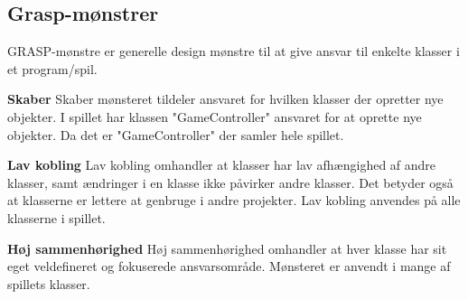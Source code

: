 \subsection{Grasp-mønstrer}
GRASP-mønstre er generelle design mønstre til at give ansvar til enkelte klasser i et program/spil.

\vspace{.3cm}
\textbf{Skaber}
Skaber mønsteret tildeler ansvaret for hvilken klasser der opretter nye objekter.
I spillet har klassen "GameController" ansvaret for at oprette nye objekter. Da det er "GameController" der samler hele spillet.

\vspace{.3cm}
\textbf{Lav kobling}
Lav kobling omhandler at klasser har lav afhængighed af andre klasser, samt ændringer i en klasse ikke påvirker andre klasser. Det betyder også at klasserne er lettere at genbruge i andre projekter. Lav kobling anvendes på alle klasserne i spillet. 

\vspace{.3cm}
\textbf{Høj sammenhørighed}
Høj sammenhørighed omhandler at hver klasse har sit eget veldefineret og fokuserede ansvarsområde. Mønsteret er anvendt i mange af spillets klasser.




